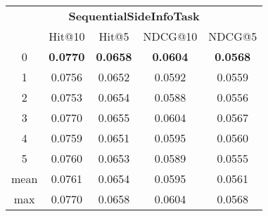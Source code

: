 \documentclass{article}
\begin{document}
 

\begin{tabular}{c|cccc}

\multicolumn{5}{c}{\textbf{SequentialSideInfoTask}} \\
\noalign{\smallskip}
\noalign{\smallskip}
\toprule
\multicolumn{1}{c}{Template ID} & \multicolumn{1}{|c}{Hit@10} & \multicolumn{1}{c}{Hit@5} & \multicolumn{1}{c}{NDCG@10} & \multicolumn{1}{c}{NDCG@5} \\
\midrule
0 & \textbf{0.0770} & \textbf{0.0658} & \textbf{0.0604} & \textbf{0.0568} \\
1 & 0.0756 & 0.0652 & 0.0592 & 0.0559 \\
2 & 0.0753 & 0.0654 & 0.0588 & 0.0556 \\
3 & 0.0770 & 0.0655 & 0.0604 & 0.0567 \\
4 & 0.0759 & 0.0651 & 0.0595 & 0.0560 \\
5 & 0.0760 & 0.0653 & 0.0589 & 0.0555 \\
\midrule
mean & 0.0761 & 0.0654 & 0.0595 & 0.0561 \\
max & 0.0770 & 0.0658 & 0.0604 & 0.0568 \\
\bottomrule

\end{tabular}
\end{document}
